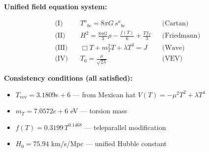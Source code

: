 
\textbf{Unified field equation system:}

\begin{align}
  \text{(I)} \quad & T^a{}_{bc} = 8\pi G \, s^a{}_{bc} && \text{(Cartan)} \\
  \text{(II)} \quad & H^2 = \frac{8\pi G}{3}\rho - \frac{f(T)}{6} + \frac{Tf_T}{3} && \text{(Friedmann)} \\
  \text{(III)} \quad & \Box T + m_T^2 T + \lambda T^3 = J && \text{(Wave)} \\
  \text{(IV)} \quad & T_0 = \frac{\mu}{\sqrt{2\lambda}} && \text{(VEV)}
\end{align}

\textbf{Consistency conditions (all satisfied):}
\begin{itemize}
  \item $T_{\text{vev}} = 3.1809e+6$ — from Mexican hat $V(T) = -\mu^2 T^2 + \lambda T^4$
  \item $m_T = 7.0572e+6$ eV — torsion mass
  \item $f(T) = 0.3199 \, T^{0.1468}$ — teleparallel modification
  \item $H_0 = 75.94$ km/s/Mpc — unified Hubble constant
\end{itemize}